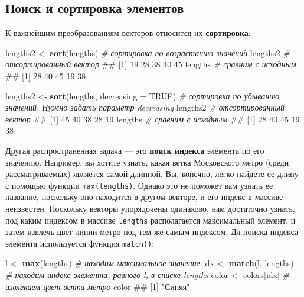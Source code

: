 \documentclass[]{book}
\newenvironment{Shaded}{\begin{snugshade}}{\end{snugshade}}
\newcommand{\KeywordTok}[1]{\textcolor[rgb]{0.13,0.29,0.53}{\textbf{#1}}}
\newcommand{\DataTypeTok}[1]{\textcolor[rgb]{0.13,0.29,0.53}{#1}}
\newcommand{\StringTok}[1]{\textcolor[rgb]{0.31,0.60,0.02}{#1}}
\newcommand{\CommentTok}[1]{\textcolor[rgb]{0.56,0.35,0.01}{\textit{#1}}}
\newcommand{\OtherTok}[1]{\textcolor[rgb]{0.56,0.35,0.01}{#1}}
\newcommand{\NormalTok}[1]{#1}
\begin{document}
\subsection{Поиск и сортировка элементов}\label{vector_search_sorting}

К важнейшим преобразованиям векторов относится их \textbf{сортировка}:

\begin{Shaded}
\begin{Highlighting}[]
\NormalTok{lengths2 <-}\StringTok{ }\KeywordTok{sort}\NormalTok{(lengths) }\CommentTok{# сортировка по возрастанию значений}
\NormalTok{lengths2 }\CommentTok{# отсортированный вектор}
\NormalTok{## [1] 19 28 38 40 45}
\NormalTok{lengths }\CommentTok{# сравним с исходным}
\NormalTok{## [1] 28 40 45 19 38}

\NormalTok{lengths2 <-}\StringTok{ }\KeywordTok{sort}\NormalTok{(lengths, }\DataTypeTok{decreasing =} \OtherTok{TRUE}\NormalTok{) }\CommentTok{# сортировка по убыванию значений. Нужно задать параметр decreasing}
\NormalTok{lengths2 }\CommentTok{# отсортированный вектор}
\NormalTok{## [1] 45 40 38 28 19}
\NormalTok{lengths }\CommentTok{# сравним с исходным}
\NormalTok{## [1] 28 40 45 19 38}
\end{Highlighting}
\end{Shaded}

Другая распространенная задача --- это \textbf{поиск индекса} элемента
по его значению. Например, вы хотите узнать, какая ветка Московского
метро (среди рассматриваемых) является самой длинной. Вы, конечно, легко
найдете ее длину с помощью функции \texttt{max(lengths)}. Однако это не
поможет вам узнать ее название, поскольку оно находится в другом
векторе, и его индекс в массиве неизвестен. Поскольку векторы
упорядочены одинаково, нам достаточно узнать, под каким индексом в
массиве \texttt{lengths} располагается максимальный элемент, и затем
извлечь цвет линии метро под тем же самым индексом. Дл поиска индекса
элемента используется функция \texttt{match()}:

\begin{Shaded}
\begin{Highlighting}[]
\NormalTok{l <-}\StringTok{ }\KeywordTok{max}\NormalTok{(lengths) }\CommentTok{# находим максимальное значение}
\NormalTok{idx <-}\StringTok{ }\KeywordTok{match}\NormalTok{(l, lengths) }\CommentTok{# находим индекс элемента, равного l, в списке lengths}
\NormalTok{color <-}\StringTok{ }\NormalTok{colors[idx] }\CommentTok{# извлекаем цвет ветки метро}
\NormalTok{color}
\NormalTok{## [1] "Синяя"}
\end{Highlighting}
\end{Shaded}
\end{document}
